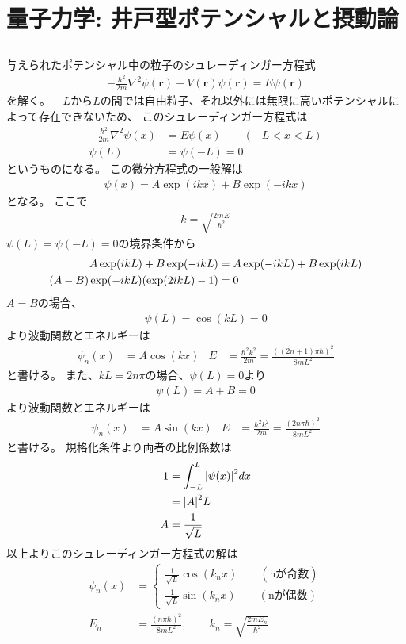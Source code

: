 \documentclass[../../master.tex]{subfiles}
\begin{document}
\section{量子力学: 井戸型ポテンシャルと摂動論}
\subsection{}
与えられたポテンシャル中の粒子のシュレーディンガー方程式
\begin{align}
    -\frac{\hbar^2}{2m}\nabla^2\psi(\boldsymbol{r}) + V(\boldsymbol{r})\psi(\boldsymbol{r}) = E\psi(\boldsymbol{r})
\end{align}
を解く。
\(-L\)から\(L\)の間では自由粒子、それ以外には無限に高いポテンシャルによって存在できないため、
このシュレーディンガー方程式は
\begin{align}
    -\frac{\hbar^2}{2m}\nabla^2 \psi(x) &= E\psi(x) \qquad (-L<x<L)\\
    \psi(L) &= \psi(-L) = 0
\end{align}
というものになる。
この微分方程式の一般解は
\begin{align}
    \psi(x) = A\exp(ikx) + B\exp(-ikx)
\end{align}
となる。
ここで
\begin{align}
    k = \sqrt{\frac{2mE}{\hbar^2}}
\end{align}
\(\psi(L)=\psi(-L)=0\)の境界条件から
\begin{align}
    A\exp(ikL) + B\exp(-ikL)
    &= A\exp(-ikL) + B\exp(ikL)\\
    (A-B)\exp(-ikL)\qty(\exp(2ikL)-1)&=0
\end{align}
\(A=B\)の場合、
\begin{align}
    \psi(L) = \cos(kL)=0
\end{align}
より波動関数とエネルギーは
\begin{align}
    \psi_n(x) &= A \cos(kx) &
    E &= \frac{\hbar^2 k^2}{2m} = \frac{((2n+1)\pi\hbar)^2}{8mL^2}
\end{align}
と書ける。
また、\(kL=2n\pi\)の場合、\(\psi(L)=0\)より
\begin{align}
    \psi(L) = A + B=0
\end{align}
より波動関数とエネルギーは
\begin{align}
    \psi_n(x) &= A \sin(kx) &
    E &= \frac{\hbar^2 k^2}{2m} = \frac{(2n\pi\hbar)^2}{8mL^2}
\end{align}
と書ける。
規格化条件より両者の比例係数は
\begin{align}
    1 &= \int_{-L}^{L}\abs{\psi(x)}^2 dx\\
    &= \abs{A}^2 L\\
    A &= \frac{1}{\sqrt{L}}
\end{align}
以上よりこのシュレーディンガー方程式の解は
\begin{align}
    \psi_n(x) &=
    \begin{cases}
        \frac{1}{\sqrt{L}}\cos(k_nx) \qquad(\text{nが奇数}) \\
        \frac{1}{\sqrt{L}}\sin(k_nx) \qquad(\text{nが偶数})
    \end{cases}\\
    E_n &= \frac{(n\pi\hbar)^2}{8mL^2},\qquad k_n = \sqrt{\frac{2mE_n}{\hbar^2}}
\end{align}
\end{document}
